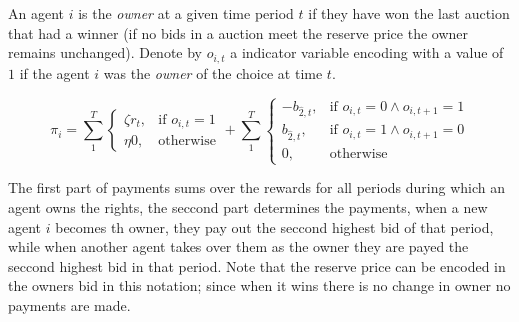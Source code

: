 \begin{mech}

An agent $i$ is the \emph{owner} at a given time period $t$ if they have won the last auction that had a winner (if no bids in a auction meet the reserve price the owner remains unchanged). 
Denote by $o_{i,t}$ a indicator variable encoding with a value of $1$ if the agent $i$ was the \emph{owner} of the choice at time $t$. 

\[
    \pi_i =  \sum_1^T
\begin{cases}
    \zeta r_t ,& \text{if } o_{i,t} = 1\\
    \eta 0,              & \text{otherwise}
\end{cases}
+
\sum_1^T
\begin{cases}
     - b_{\hat{2},t} ,& \text{if } o_{i,t} = 0 \land o_{i,t+1} = 1\\
      b_{\hat{2},t} ,& \text{if } o_{i,t}= 1 \land o_{i,t+1} = 0 \\
		0,              & \text{otherwise}
\end{cases}
\]


The first part of payments sums over the rewards for all periods during which an agent owns the rights, the seccond part determines the payments, when a new agent $i$ becomes th owner, they pay out the seccond highest bid of that period, while when another agent takes over them as the owner they are payed the seccond highest bid in that period. Note that the reserve price can be encoded in the owners bid in this notation; since when it wins there is no change in owner no payments are made. 

\end{mech}






